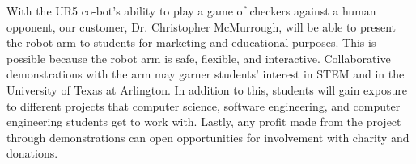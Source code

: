 With the UR5 co-bot's ability to play a game of checkers against a human opponent, our customer, Dr. Christopher McMurrough, will be able to present the robot arm to students for marketing and educational purposes. This is possible because the robot arm is safe, flexible, and interactive. Collaborative demonstrations with the arm may garner students' interest in STEM and in the University of Texas at Arlington. In addition to this, students will gain exposure to different projects that computer science, software engineering, and computer engineering students get to work with. Lastly, any profit made from the project through demonstrations can open opportunities for involvement with charity and donations.


